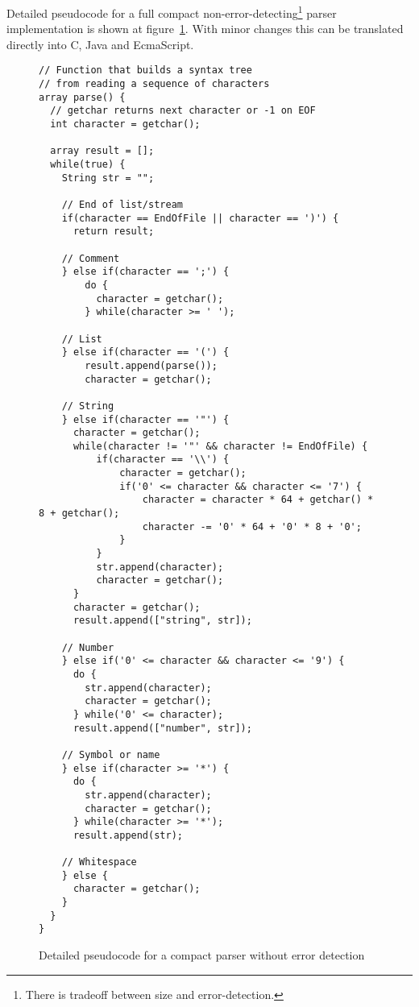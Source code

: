 Detailed pseudocode for a full compact non-error-detecting\footnote{There is tradeoff between size and error-detection.} parser implementation is shown at figure~\ref{parsercode}. With minor changes this can be translated directly into C, Java and EcmaScript.
\begin{figure}
{\scriptsize
\begin{verbatim}
// Function that builds a syntax tree 
// from reading a sequence of characters
array parse() {
  // getchar returns next character or -1 on EOF
  int character = getchar(); 

  array result = [];
  while(true) {
    String str = "";

    // End of list/stream
    if(character == EndOfFile || character == ')') {
      return result;

    // Comment
    } else if(character == ';') {
        do {
          character = getchar();
        } while(character >= ' ');

    // List
    } else if(character == '(') {
        result.append(parse());
        character = getchar();

    // String
    } else if(character == '"') {
      character = getchar();
      while(character != '"' && character != EndOfFile) {
          if(character == '\\') {
              character = getchar();
              if('0' <= character && character <= '7') {
                  character = character * 64 + getchar() * 8 + getchar();
                  character -= '0' * 64 + '0' * 8 + '0';
              }
          }
          str.append(character);
          character = getchar();
      }
      character = getchar();
      result.append(["string", str]);

    // Number
    } else if('0' <= character && character <= '9') {
      do {
        str.append(character);
        character = getchar();
      } while('0' <= character);
      result.append(["number", str]);

    // Symbol or name
    } else if(character >= '*') {
      do {
        str.append(character);
        character = getchar();
      } while(character >= '*');
      result.append(str);

    // Whitespace
    } else {
      character = getchar();
    }
  }
}
\end{verbatim}
}
\caption{Detailed pseudocode for a compact parser without error detection}
\label{parsercode}
\end{figure}

